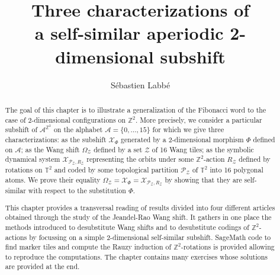 \documentclass[12pt]{amsart}
\begin{document}

\title[Three characterizations of a self-similar aperiodic 2-dimensional subshift]
      {Three characterizations of\\a self-similar aperiodic 2-dimensional subshift}
\author[S.~Labb\'e]{S\'ebastien Labb\'e}
\address[S.~Labb\'e]{Univ. Bordeaux, CNRS,  Bordeaux INP, LaBRI, UMR 5800, F-33400, Talence, France}


\begin{abstract}
The goal of this chapter is to illustrate a generalization of the Fibonacci
word to the case of 2-dimensional configurations on $\mathbb{Z}^2$.  More
precisely, we consider a particular subshift of $\mathcal{A}^{\mathbb{Z}^2}$ on
the alphabet $\mathcal{A}=\{0,\dots,15\}$ for which we give three
characterizations: as the subshift $\mathcal{X}_\Phi$ generated by a
2-dimensional morphism $\Phi$ defined on $\mathcal{A}$; as the Wang shift
$\Omega_\mathcal{Z}$ defined by a set $\mathcal{Z}$ of 16 Wang tiles; as the
symbolic dynamical system $\mathcal{X}_{\mathcal{P}_\mathcal{Z},R_\mathcal{Z}}$
representing the orbits under some $\mathbb{Z}^2$-action $R_\mathcal{Z}$
defined by rotations on $\mathbb{T}^2$ and coded by some topological partition
$\mathcal{P}_\mathcal{Z}$ of $\mathbb{T}^2$ into 16 polygonal atoms.  We prove
their equality $\Omega_\mathcal{Z}
=\mathcal{X}_\Phi=\mathcal{X}_{\mathcal{P}_\mathcal{Z},R_\mathcal{Z}}$ by
showing that they are self-similar with respect to the substitution $\Phi$.

This chapter provides a transversal reading of results divided into four
different articles obtained through the study of the Jeandel-Rao Wang shift.
It gathers in one place the methods introduced to desubstitute Wang shifts and
to desubstitute codings of $\mathbb{Z}^2$-actions by focussing on a simple
2-dimensional self-similar subshift. SageMath code to find marker tiles and
compute the Rauzy induction of $\mathbb{Z}^2$-rotations is provided 
allowing to reproduce the computations. The chapter contains many exercises
whose solutions are provided at the end.
\end{abstract}


\maketitle

\setcounter{tocdepth}{1}
\tableofcontents
\end{document}
